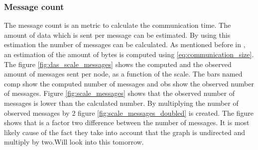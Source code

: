 \subsubsection{Message count}
The message count is an metric to calculate the communication time. The amount of data which is sent per message can be estimated. By using this estimation the number of messages can be calculated. As mentioned before in \cite{suzumura2011performance}, an estimation of the amount of bytes is computed using \ref{eq:communication_size}. The figure \ref{fig:das_scale_messages} shows the computed and the observed amount of messages sent per node, as a function of the scale. The bars named comp show the computed number of messages and obs show the observed number of messages. Figure \ref{fig:scale_messages} shows that the observed number of messages is lower than the calculated number. By multiplying the number of observed messages by 2 figure \ref{fig:scale_messages_doubled} is created. The figure shows that is a factor two difference between the number of messages. It is most likely cause of the fact they take into account that the graph is undirected and multiply by two.Will look into this tomorrow. 
